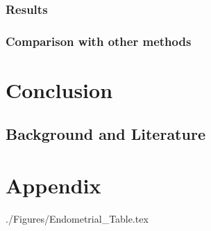 \documentclass[11pt]{extarticle}
\begin{document}
\subsubsection{Results}
\subsubsection{Comparison with other methods}
\section{Conclusion}
\subsection{Background and Literature}




\section{Appendix}

{./Figures/Endometrial_Table.tex}
\end{document}
